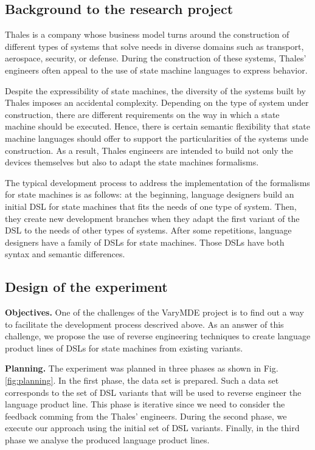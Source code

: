 \subsection{Background to the research project}
Thales is a company whose business model turns around the construction of different types of systems that solve needs in diverse domains such as transport, aerospace, security, or defense. During the construction of these systems, Thales' engineers often appeal to the use of state machine languages to express behavior.

Despite the expressibility of state machines, the diversity of the systems built by Thales imposes an accidental complexity. Depending on the type of system under construction, there are different requirements on the way in which a state machine should be executed. Hence, there is certain semantic flexibility that state machine languages should offer to support the particularities of the systems unde construction. As a result, Thales engineers are intended to build not only the devices themselves but also to adapt the state machines formalisms.

The typical development process to address the implementation of the formalisms for state machines is as follows: at the beginning, language designers build an initial DSL for state machines that fits the needs of one type of system. Then, they create new development branches when they adapt the first variant of the DSL to the needs of other types of systems. After some repetitions, language designers have a family of DSLs for state machines. Those DSLs have both syntax and semantic differences.

\subsection{Design of the experiment}

\textbf{Objectives.} One of the challenges of the VaryMDE project is to find out a way to facilitate the development process descrived above. As an answer of this challenge, we propose the use of reverse engineering techniques to create language product lines of DSLs for state machines from existing variants.

\vspace{2mm}
\textbf{Planning.} The experiment was planned in three phases as shown in Fig. \ref{fig:planning}. In the first phase, the data set is prepared. Such a data set corresponds to the set of DSL variants that will be used to reverse engineer the language product line. This phase is iterative since we need to consider the feedback comming from the Thales' engineers. During the second phase, we execute our approach using the initial set of DSL variants. Finally, in the third phase we analyse the produced language product lines.

